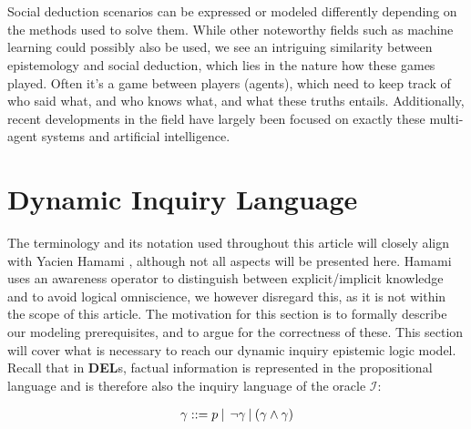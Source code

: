 \\\\

Social deduction scenarios can be expressed or modeled differently depending on the methods used to solve them. While other noteworthy fields such as machine learning could possibly also be used, we see an intriguing similarity between epistemology and social deduction, which lies in the nature how these games played. Often it's a game between players (agents), which need to keep track of who said what, and who knows what, and what these truths entails. Additionally, recent developments in the field have largely been focused on exactly these multi-agent systems and artificial intelligence. 

\section{Dynamic Inquiry Language}
The terminology and its notation used throughout this article will closely
align with Yacien Hamami \cite{delimi}, although not all aspects will be
presented here. Hamami uses an awareness operator to distinguish between explicit/implicit knowledge and to avoid logical omniscience, we however disregard this, as it is not within the scope of this article. \newline
The motivation for this section is to formally describe our
modeling prerequisites, and to argue for the correctness of these. This section will cover what is necessary to reach
our dynamic inquiry epistemic logic model. Recall that in \textbf{DEL}s,
factual information is represented in the propositional language and is
therefore also the inquiry language of the oracle $\mathscr{I}$: 

\begin{align}
	\gamma::= p \:|\:\:\neg\gamma\:|\:(\gamma\land\gamma) 
\end{align}

